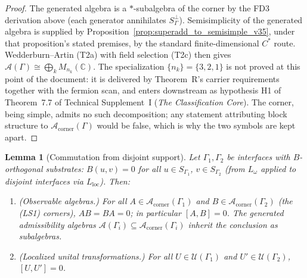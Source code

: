 \documentclass[11pt]{article}
\newtheorem{lemma}[theorem]{Lemma}
\theoremstyle{definition}
\newcommand{\TSI}{Technical Supplement~I (\emph{The Classification Core})}
\begin{document}
\begin{proof}
The generated algebra is a $*$-subalgebra of the corner by the FD3
derivation above (each generator annihilates $S_\Gamma^\perp$).
Semisimplicity of the generated algebra is supplied by
Proposition~\ref{prop:superadd_to_semisimple_v35}, under that
proposition's stated premises, by the standard finite-dimensional
$C^*$ route.  Wedderburn--Artin (T2a) with field selection
(T2c) then gives $\mathcal{A}(\Gamma) \cong \bigoplus_k
M_{n_k}(\mathbb{C})$.  The specialization $\{n_k\} = \{3,2,1\}$ is not
proved at this point of the document: it is delivered by Theorem~R's
carrier requirements together with the fermion scan, and enters
downstream as hypothesis H1 of
Theorem~7.7 of \TSI{}.  The corner, being simple,
admits no such decomposition; any statement attributing block
structure to $\mathcal{A}_{\mathrm{corner}}(\Gamma)$ would be false,
which is why the two symbols are kept apart.
\end{proof}

\begin{lemma}[Commutation from disjoint support]
\label{lem:loc_commut}
Let $\Gamma_1, \Gamma_2$ be interfaces with $B$-orthogonal substrates:
$B(u, v) = 0$ for all $u \in S_{\Gamma_1}$, $v \in S_{\Gamma_2}$
(from $L_\omega$ applied to disjoint interfaces via $L_{\mathrm{loc}}$).
Then:
\begin{enumerate}[label=(\roman*),nosep]
  \item (\emph{Observable algebras.})  For all
  $A \in \mathcal{A}_{\mathrm{corner}}(\Gamma_1)$ and
  $B \in \mathcal{A}_{\mathrm{corner}}(\Gamma_2)$
  (the (LS1) corners), $AB = BA = 0$; in particular $[A, B] = 0$.
  The generated admissibility algebras
  $\mathcal{A}(\Gamma_i) \subseteq
  \mathcal{A}_{\mathrm{corner}}(\Gamma_i)$ inherit the conclusion as
  subalgebras.
  \item (\emph{Localized unital transformations.})  For all
  $U \in \mathcal{U}(\Gamma_1)$ and $U' \in \mathcal{U}(\Gamma_2)$,
  $[U, U'] = 0$.
\end{enumerate}
\end{lemma}
\end{document}
